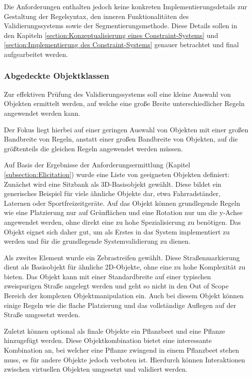 Die Anforderungen enthalten jedoch keine konkreten Implementierungsdetails zur Gestaltung der Regelsyntax, den inneren Funktionalitäten des Validierungssystems sowie der Segmentierungsmethode. Diese Details sollen in den Kapiteln \ref{section:Konzeptualisierung eines Constraint-Systems} und \ref{section:Implementierung des Constraint-Systems} genauer betrachtet und final aufgearbeitet werden.

\subsubsection{Abgedeckte Objektklassen}

Zur effektiven Prüfung des Validierungssystems soll eine kleine Auswahl von Objekten ermittelt werden, auf welche eine große Breite unterschiedlicher Regeln angewendet werden kann.

Der Fokus liegt hierbei auf einer geringen Auswahl von Objekten mit einer großen Bandbreite von Regeln, anstatt einer großen Bandbreite von Objekten, auf die größtenteils die gleichen Regeln angewendet werden müssen.

Auf Basis der Ergebnisse der Anforderungsermittlung (Kapitel \ref{subsection:Elicitation}) wurde eine Liste von geeigneten Objekten definiert: Zunächst wird eine Sitzbank als 3D-Basisobjekt gewählt. Diese bildet ein generisches Beispiel für viele ähnliche Objekte dar, etwa Fahrradständer, Laternen oder Sportfreizeitgeräte. Auf das Objekt können grundlegende Regeln wie eine Platzierung nur auf Grünflächen und eine Rotation nur um die y-Achse angewendet werden, ohne direkt eine zu hohe Spezialisierung zu benötigen. Das Objekt eignet sich daher gut, um als Erstes in das System implementiert zu werden und für die grundlegende Systemvalidierung zu dienen.

Als zweites Element wurde ein Zebrastreifen gewählt. Diese Straßenmarkierung dient als Basisobjekt für ähnliche 2D-Objekte, ohne eine zu hohe Komplexität zu bieten. Das Objekt kann mit einer Standardbreite auf einer typischen zweispurigen Straße angelegt werden und geht so nicht in den Out of Scope Bereich der komplexen Objektmanipulation ein. Auch bei diesem Objekt können einige Regeln wie die flache Platzierung und das vollständige Auflegen auf der Straße umgesetzt werden.

Zuletzt können optional als finale Objekte ein Pflanzbeet und eine Pflanze hinzugefügt werden. Diese Objektkombination bietet eine interessante Kombination an, bei welcher eine Pflanze zwingend in einem Pflanzbeet stehen muss, es für andere Objekte jedoch verboten ist. Hierdurch können Interaktionen zwischen virtuellen Objekten umgesetzt und validiert werden.

